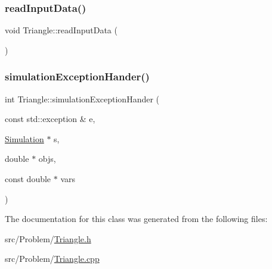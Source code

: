 \subsubsection{\texorpdfstring{read\+Input\+Data()}{readInputData()}}
{\footnotesize\ttfamily void Triangle\+::read\+Input\+Data (\begin{DoxyParamCaption}{ }\end{DoxyParamCaption})}

\mbox{\label{classTriangle_a816ff476231f6bd575c82978706f4b9a}} 
\subsubsection{\texorpdfstring{simulation\+Exception\+Hander()}{simulationExceptionHander()}}
{\footnotesize\ttfamily int Triangle\+::simulation\+Exception\+Hander (\begin{DoxyParamCaption}\item[{const std\+::exception \&}]{e,  }\item[{\mbox{\hyperlink{classSimulation}{Simulation}} $\ast$}]{s,  }\item[{double $\ast$}]{objs,  }\item[{const double $\ast$}]{vars }\end{DoxyParamCaption})}



The documentation for this class was generated from the following files\+:\begin{DoxyCompactItemize}
\item 
src/\+Problem/\mbox{\hyperlink{Triangle_8h}{Triangle.\+h}}\item 
src/\+Problem/\mbox{\hyperlink{Triangle_8cpp}{Triangle.\+cpp}}\end{DoxyCompactItemize}
